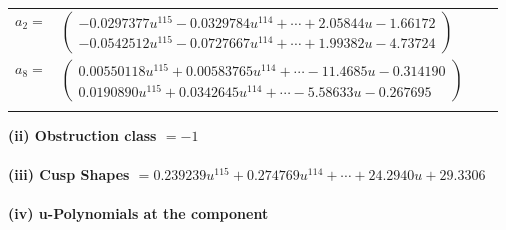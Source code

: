 \documentclass[1p]{elsarticle_modified}
\theoremstyle{definition}
\begin{document}
\begin{tabular}{m{7pt} m{180pt} m{7pt} m{180pt} }
\flushright $a_{2}=$&$\begin{pmatrix}-0.0297377 u^{115}-0.0329784 u^{114}+\cdots+2.05844 u-1.66172\\-0.0542512 u^{115}-0.0727667 u^{114}+\cdots+1.99382 u-4.73724\end{pmatrix}$ \\
\flushright $a_{8}=$&$\begin{pmatrix}0.00550118 u^{115}+0.00583765 u^{114}+\cdots-11.4685 u-0.314190\\0.0190890 u^{115}+0.0342645 u^{114}+\cdots-5.58633 u-0.267695\end{pmatrix}$\\&\end{tabular}
\flushleft \textbf{(ii) Obstruction class $= -1$}\\~\\
\flushleft \textbf{(iii) Cusp Shapes $= 0.239239 u^{115}+0.274769 u^{114}+\cdots+24.2940 u+29.3306$}\\~\\
\newpage\renewcommand{\arraystretch}{1}
\flushleft \textbf{(iv) u-Polynomials at the component}\newline \\
\end{document}
